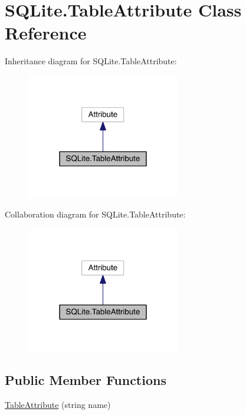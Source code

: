 \hypertarget{class_s_q_lite_1_1_table_attribute}{\section{S\+Q\+Lite.\+Table\+Attribute Class Reference}
\label{class_s_q_lite_1_1_table_attribute}
}


Inheritance diagram for S\+Q\+Lite.\+Table\+Attribute\+:
\nopagebreak
\begin{figure}[H]
\begin{center}
\leavevmode
\includegraphics[width=190pt]{class_s_q_lite_1_1_table_attribute__inherit__graph}
\end{center}
\end{figure}


Collaboration diagram for S\+Q\+Lite.\+Table\+Attribute\+:
\nopagebreak
\begin{figure}[H]
\begin{center}
\leavevmode
\includegraphics[width=190pt]{class_s_q_lite_1_1_table_attribute__coll__graph}
\end{center}
\end{figure}
\subsection*{Public Member Functions}
\begin{DoxyCompactItemize}
\item 
\hyperlink{class_s_q_lite_1_1_table_attribute_aa1d302b1fb306a6f5fcbbf5116c9ac55}{Table\+Attribute} (string name)
\end{DoxyCompactItemize}
